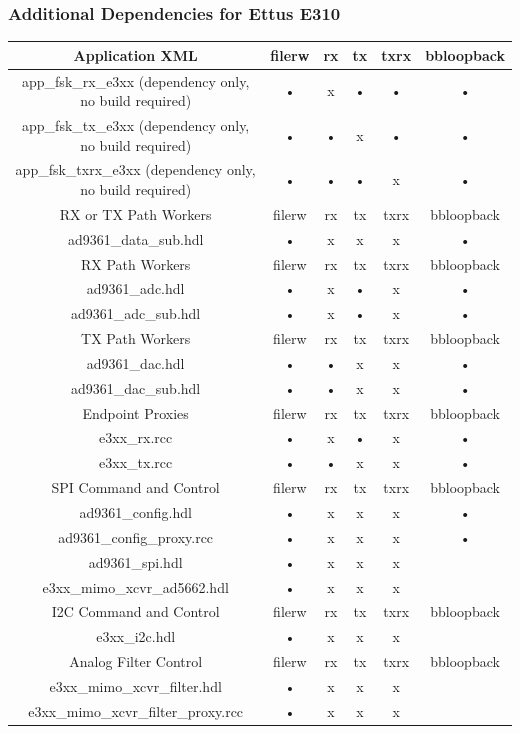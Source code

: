 \subsubsection{Additional Dependencies for Ettus E310}
	\begin{tabular}{|c|c|c|c|c|c|}
	\hline
	\rowcolor{blue}
	Application XML & filerw & rx & tx & txrx & bbloopback \\
	\hline
	app\_fsk\_rx\_e3xx (dependency only, no build required) & • & x & • & • & • \\
	\hline
	app\_fsk\_tx\_e3xx (dependency only, no build required) & • & • & x & • & • \\
	\hline
	app\_fsk\_txrx\_e3xx (dependency only, no build required) & • & •  & • & x & • \\
	\hline
	\rowcolor{blue}
	RX or TX Path Workers & filerw & rx & tx & txrx & bbloopback \\
	\hline
	ad9361\_data\_sub.hdl & • & x & x & x & • \\
	\rowcolor{blue}
	RX Path Workers & filerw & rx & tx & txrx & bbloopback \\
	\hline
	ad9361\_adc.hdl & • & x & • & x & • \\
	\hline
	ad9361\_adc\_sub.hdl & • & x & • & x & • \\
	\hline
	\rowcolor{blue}
	TX Path Workers & filerw & rx & tx & txrx & bbloopback \\
	\hline
	ad9361\_dac.hdl & • & • & x & x & • \\
	\hline
	ad9361\_dac\_sub.hdl & • & • & x & x & • \\
	\rowcolor{blue}
	Endpoint Proxies & filerw & rx & tx & txrx & bbloopback \\
	\hline
	e3xx\_rx.rcc & • & x & • & x & • \\
	\hline
	e3xx\_tx.rcc & • & • & x & x & • \\
	\hline
	\rowcolor{blue}
	SPI Command and Control & filerw & rx & tx & txrx & bbloopback \\
	\hline
	ad9361\_config.hdl & • & x & x & x & • \\
	\hline
	ad9361\_config\_proxy.rcc & • & x & x & x & •  \\
	\hline
	ad9361\_spi.hdl & • & x & x & x &   \\
	\hline
	e3xx\_mimo\_xcvr\_ad5662.hdl & • & x & x & x &   \\
	\hline
	\rowcolor{blue}
	I2C Command and Control & filerw & rx & tx & txrx & bbloopback \\
	\hline
	e3xx\_i2c.hdl & • & x & x & x &   \\
	\hline
	\rowcolor{blue}
	Analog Filter Control & filerw & rx & tx & txrx & bbloopback \\
	\hline
	e3xx\_mimo\_xcvr\_filter.hdl & • & x & x & x &   \\
	\hline
	e3xx\_mimo\_xcvr\_filter\_proxy.rcc & • & x & x & x &   \\
	\hline
	\end{tabular}

